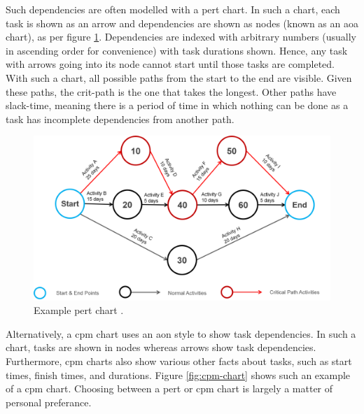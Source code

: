 \documentclass[11pt]{article}
\begin{document}
Such dependencies are often modelled with a \acrfull{pert} chart. In such a chart, each task is shown as an arrow and dependencies are shown as nodes (known as an \acrfull{aoa} chart), as per figure \ref{fig:pert-chart}. Dependencies are indexed with arbitrary numbers (usually in ascending order for convenience) with task durations shown. Hence, any task with arrows going into its node cannot start until those tasks are completed. With such a chart, all possible paths from the start to the end are visible. Given these paths, the \gls{crit-path} is the one that takes the longest. Other paths have \gls{slack-time}, meaning there is a period of time in which nothing can be done as a task has incomplete dependencies from another path.

\begin{figure}[h!]
    \centering
    \includegraphics[width=\textwidth]{figures/pert.png}
    \caption{Example \acrshort{pert} chart \cite{pert}.}
    \label{fig:pert-chart}
\end{figure}

Alternatively, a \acrfull{cpm} chart uses an \acrfull{aon} style to show task dependencies. In such a chart, tasks are shown in nodes whereas arrows show task dependencies. Furthermore, \acrshort{cpm} charts also show various other facts about tasks, such as start times, finish times, and durations. Figure \ref{fig:cpm-chart} shows such an example of a \acrshort{cpm} chart. Choosing between a \acrshort{pert} or \acrshort{cpm} chart is largely a matter of personal preferance.
\end{document}
